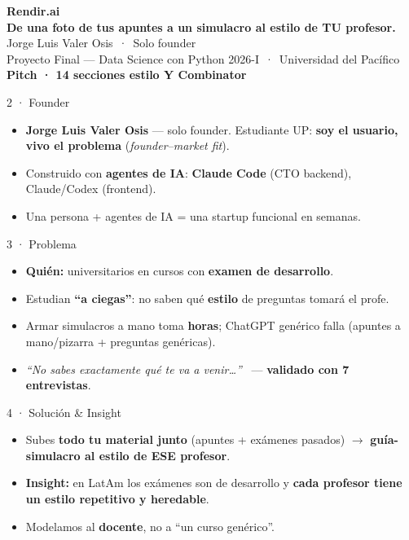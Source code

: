 \documentclass[aspectratio=169,11pt]{beamer}
\newcommand{\hi}[1]{\textcolor{amberdeep}{\textbf{#1}}}
\begin{document}
\begin{frame}[plain]
  \centering
  \vfill
  {\color{amber}\fontsize{52}{58}\selectfont\bfseries Rendir.ai}\\[0.5em]
  {\Large\bfseries De una foto de tus apuntes a un simulacro al estilo de TU profesor.}\\[1.8em]
  {\large Jorge Luis Valer Osis\, · \,Solo founder}\\[0.3em]
  {\normalsize Proyecto Final — Data Science con Python 2026-I\, · \,Universidad del Pacífico}\\[1.2em]
  {\color{amberdeep}\large\bfseries Pitch · 14 secciones estilo Y Combinator}
  \vfill
\end{frame}

\begin{frame}{2 · Founder}
  \large
  \begin{itemize}
    \item \hi{Jorge Luis Valer Osis} — solo founder. Estudiante UP: \textbf{soy el usuario, vivo el problema} (\emph{founder–market fit}).
    \item Construido con \textbf{agentes de IA}: \hi{Claude Code} (CTO backend), Claude/Codex (frontend).
    \item Una persona + agentes de IA = una startup funcional en semanas.
  \end{itemize}
\end{frame}

\begin{frame}{3 · Problema}
  \large
  \begin{itemize}
    \item \textbf{Quién:} universitarios en cursos con \hi{examen de desarrollo}.
    \item Estudian \textbf{``a ciegas''}: no saben qué \textbf{estilo} de preguntas tomará el profe.
    \item Armar simulacros a mano toma \hi{horas}; ChatGPT genérico falla (apuntes a mano/pizarra + preguntas genéricas).
    \item \emph{``No sabes exactamente qué te va a venir\ldots''} \, — \hi{validado con 7 entrevistas}.
  \end{itemize}
\end{frame}

\begin{frame}{4 · Solución \& Insight}
  \large
  \begin{itemize}
    \item Subes \hi{todo tu material junto} (apuntes + exámenes pasados) $\rightarrow$ \textbf{guía-simulacro al estilo de ESE profesor}.
    \item \hi{Insight:} en LatAm los exámenes son de desarrollo y \textbf{cada profesor tiene un estilo repetitivo y heredable}.
    \item Modelamos al \textbf{docente}, no a ``un curso genérico''.
  \end{itemize}
\end{frame}
\end{document}
